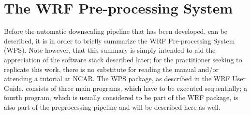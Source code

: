 \documentclass[letterpaper,12pt,headsepline,final]{scrartcl} %
\begin{document}
\section{The WRF Pre-processing System}
\label{pipe:wps}
Before the automatic downscaling pipeline that has been developed, can be described, it is in order to briefly summarize the WRF Pre-processing System (WPS). Note however, that this summary is simply intended to aid the appreciation of the software stack described later; for the practitioner seeking to replicate this work, there is no substitute for reading the manual and/or attending a tutorial at NCAR.
The WPS package, as described in the WRF User Guide, consists of three main programs, which have to be executed sequentially; a fourth program, which is usually considered to be part of the WRF package, is also part of the preprocessing pipeline and will be described here as well.
\end{document}
